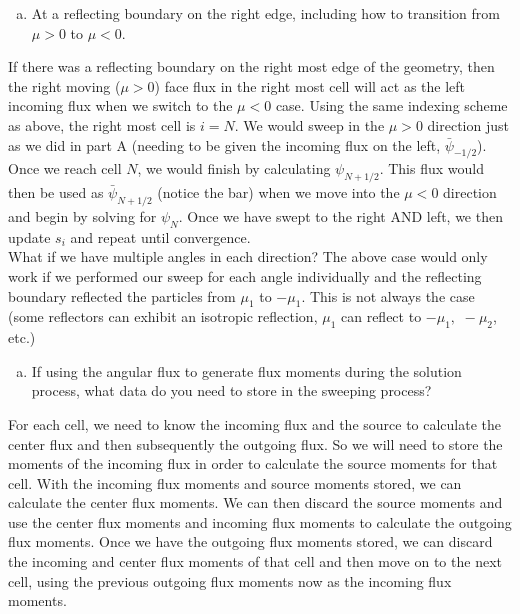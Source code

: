 \documentclass[10pt]{article}
\begin{document}
%
%
%

\vspace{10pt}
\begin{enumerate}[(c)]
\item At a reflecting boundary on the right edge, including how to transition from $\mu > 0$ to $\mu < 0$.
\end{enumerate}

If there was a reflecting boundary on the right most edge of the geometry, then the right moving ($\mu>0$) face flux in the right most cell will act as the left incoming flux when we switch to the $\mu < 0$ case. Using the same indexing scheme as above, the right most cell is $i=N$. We would sweep in the $\mu >0$ direction just as we did in part A (needing to be given the incoming flux on the left, $\bar{\psi}_{-1/2}$). Once we reach cell $N$, we would finish by calculating $\psi_{N+1/2}$. This flux would then be used as $\bar{\psi}_{N+1/2}$ (notice the bar) when we move into the $\mu<0$ direction and begin by solving for $\psi_N$. Once we have swept to the right AND left, we then update $s_i$ and repeat until convergence.\\

What if we have multiple angles in each direction? The above case would only work if we performed our sweep for each angle individually and the reflecting boundary reflected the particles from $\mu_1$ to $-\mu_1$. This is not always the case (some reflectors can exhibit an isotropic reflection, $\mu_1$ can reflect to $-\mu_1,\,\,-\mu_2$, etc.)

%
%
%

\vspace{10pt}
\begin{enumerate}[(d)]
\item If using the angular flux to generate flux moments during the solution process, what data do you need to store in the sweeping process?
\end{enumerate}

For each cell, we need to know the incoming flux and the source to calculate the center flux and then subsequently the outgoing flux. So we will need to store the moments of the incoming flux in order to calculate the source moments for that cell. With the incoming flux moments and source moments stored, we can calculate the center flux moments. We can then discard the source moments and use the center flux moments and incoming flux moments to calculate the outgoing flux moments. Once we have the outgoing flux moments stored, we can discard the incoming and center flux moments of that cell and then move on to the next cell, using the previous outgoing flux moments now as the incoming flux moments.\\
\end{document}
